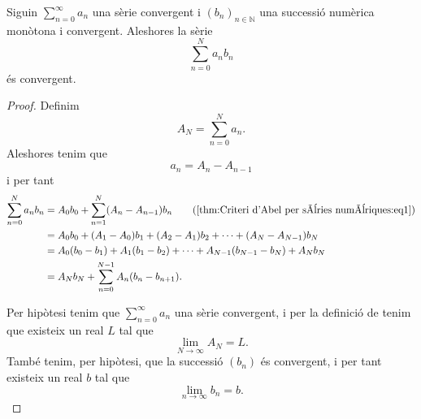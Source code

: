 \documentclass[../Apunts.tex]{subfiles}
\begin{document}
	\begin{theorem}
		\label{thm:Criteri d'Abel per sèries numèriques}
		Siguin \(\sum_{n=0}^{\infty}a_{n}\) una sèrie convergent i \((b_{n})_{n\in\mathbb{N}}\) una successió numèrica monòtona i convergent. Aleshores la sèrie
		\[\sum_{n=0}^{N}a_{n}b_{n}\]
		és convergent.
		\begin{proof}
			Definim
			\[A_{N}=\sum_{n=0}^{N}a_{n}.\]
			Aleshores tenim que
			\begin{equation}
				\label{thm:Criteri d'Abel per sèries numèriques:eq1}
				a_{n}=A_{n}-A_{n-1}
			\end{equation}
			i per tant
			\begin{align*}
				\sum_{n=0}^{N}a_{n}b_{n}&=A_{0}b_{0}+\sum_{n=1}^{N}(A_{n}-A_{n-1})b_{n} \tag{\ref{thm:Criteri d'Abel per sèries numèriques:eq1}}\\
				&=A_{0}b_{0}+(A_{1}-A_{0})b_{1}+(A_{2}-A_{1})b_{2}+\dots+(A_{N}-A_{N-1})b_{N} \\
				&=A_{0}(b_{0}-b_{1})+A_{1}(b_{1}-b_{2})+\dots+A_{N-1}(b_{N-1}-b_{N})+A_{N}b_{N} \\
				&=A_{N}b_{N}+\sum_{n=0}^{N-1}A_{n}(b_{n}-b_{n+1}).
			\end{align*}
			
			Per hipòtesi tenim que \(\sum_{n=0}^{\infty}a_{n}\) una sèrie convergent, i per la definició de  tenim que existeix un real \(L\) tal que
			\begin{equation}
				\label{thm:Criteri d'Abel per sèries numèriques:eq2}
				\lim_{N\to\infty}A_{N}=L.
			\end{equation}
			També tenim, per hipòtesi, que la successió \((b_{n})\) és convergent, i per tant existeix un real \(b\) tal que %
			\begin{equation}
				\label{thm:Criteri d'Abel per sèries numèriques:eq4}
				\lim_{n\to\infty}b_{n}=b.
			\end{equation}
			

\end{proof}
\end{theorem}
\end{document}
